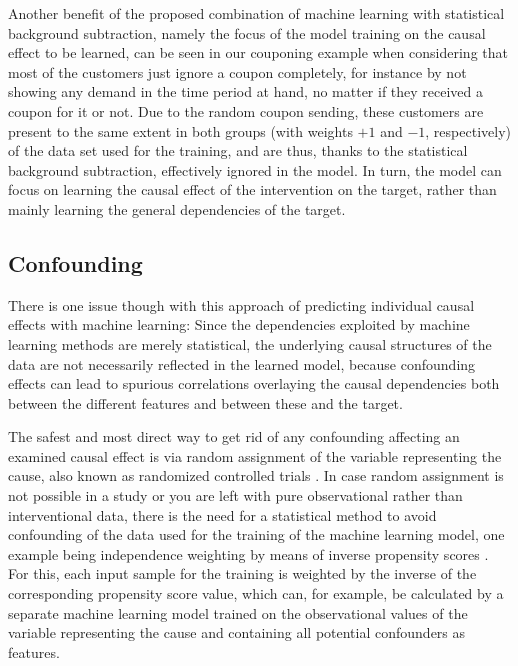 \documentclass[BCOR=1mm, DIV=calc,10pt,
twoside=true,
twocolumn,
headings=normal]{scrartcl}
\begin{document}
Another benefit of the proposed combination of machine learning with statistical background subtraction, namely the focus of the model training on the causal effect to be learned, can be seen in our couponing example when considering that most of the customers just ignore a coupon completely, for instance by not showing any demand in the time period at hand, no matter if they received a coupon for it or not. Due to the random coupon sending, these customers are present to the same extent in both groups (with weights $+1$ and $-1$, respectively) of the data set used for the training, and are thus, thanks to the statistical background subtraction, effectively ignored in the model. In turn, the model can focus on learning the causal effect of the intervention on the target, rather than mainly learning the general dependencies of the target.

\subsection{Confounding}
\label{confounding}

There is one issue though with this approach of predicting individual causal effects with machine learning: Since the dependencies exploited by machine learning methods are merely statistical, the underlying causal structures of the data are not necessarily reflected in the learned model, because confounding effects can lead to spurious correlations overlaying the causal dependencies both between the different features and between these and the target.

The safest and most direct way to get rid of any confounding affecting an examined causal effect is via random assignment of the variable representing the cause, also known as randomized controlled trials \cite{RCT}. In case random assignment is not possible in a study or you are left with pure observational rather than interventional data, there is the need for a statistical method to avoid confounding of the data used for the training of the machine learning model, one example being independence weighting by means of inverse propensity scores \cite{propensity}. For this, each input sample for the training is weighted by the inverse of the corresponding propensity score value, which can, for example, be calculated by a separate machine learning model trained on the observational values of the variable representing the cause and containing all potential confounders as features.
\end{document}
